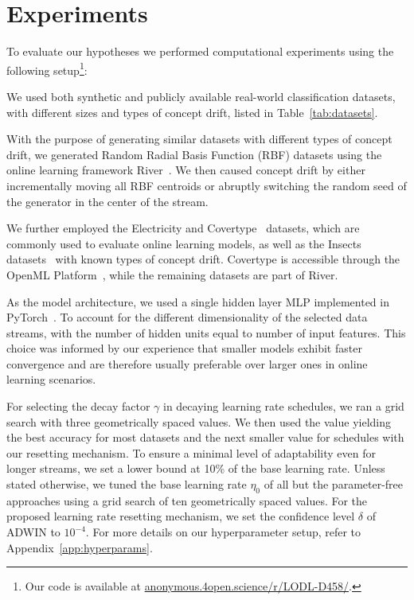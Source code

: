 \documentclass[letterpaper]{article} %
\begin{document}
\section{Experiments}\label{sec:experiments}

To evaluate our hypotheses we performed computational experiments using the following setup\footnote{Our code is available at \url{anonymous.4open.science/r/LODL-D458/}.}:

We used both synthetic and publicly available real-world classification datasets, with different sizes and types of concept drift, listed in Table~\ref{tab:datasets}.

With the purpose of generating similar datasets with different types of concept drift, we generated Random Radial Basis Function (RBF) datasets using the online learning framework River~\cite{montiel2021river}. We then caused concept drift by either incrementally moving all RBF centroids or abruptly switching the random seed of the generator in the center of the stream.

We further employed the Electricity and Covertype~\cite{misc_covertype_31} datasets, which are commonly used to evaluate online learning models, as well as the Insects datasets~\cite{souzaChallengesBenchmarkingStream2020} with known types of concept drift.
Covertype is accessible through the OpenML Platform~\cite{vanschorenOpenMLNetworkedScience2014}, while the remaining datasets are part of River.

As the model architecture, we used a single hidden layer MLP implemented in PyTorch~\cite{paszkePyTorchImperativeStyle2019}.
To account for the different dimensionality of the selected data streams, with the number of hidden units equal to number of input features.
This choice was informed by our experience that smaller models exhibit faster convergence and are therefore usually preferable over larger ones in online learning scenarios.

For selecting the decay factor $\gamma$ in decaying learning rate schedules, we ran a grid search with three geometrically spaced values.
We then used the value yielding the best accuracy for most datasets and the next smaller value for schedules with our resetting mechanism.
To ensure a minimal level of adaptability even for longer streams, we set a lower bound at 10\% of the base learning rate.
Unless stated otherwise, we tuned the base learning rate $\eta_0$ of all but the parameter-free approaches using a grid search of ten geometrically spaced values.
For the proposed learning rate resetting mechanism, we set the confidence level $\delta$ of ADWIN to $10^{-4}$.
For more details on our hyperparameter setup, refer to Appendix~\ref{app:hyperparams}.
\end{document}
